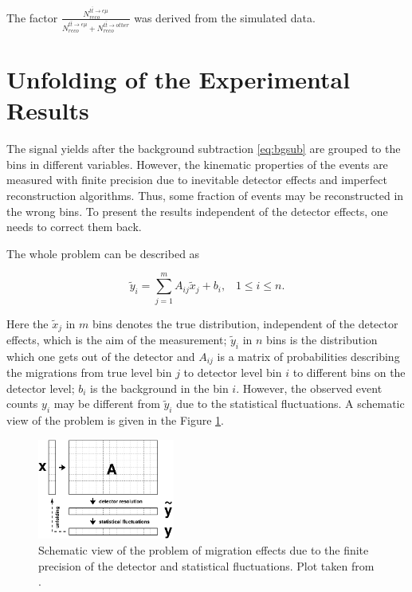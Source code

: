 The factor $\frac{N^{t\bar{t} \rightarrow e\mu}_{reco}}{N^{t\bar{t} \rightarrow e\mu}_{reco} + N^{t\bar{t} \rightarrow other}_{reco}}$ was derived
from the simulated data.

\section{Unfolding of the Experimental Results}\label{sec:unfold}

The signal yields after the background  subtraction \ref{eq:bgsub} are grouped to the bins in different variables. However, the kinematic properties
of the events are measured with finite precision due to inevitable detector effects and imperfect reconstruction algorithms.
Thus, some fraction of events may be reconstructed in the wrong bins. To present the results independent of the detector effects,
one needs to correct them back.

The whole problem can be described as

\begin{equation}\label{eq:UnfoldProb}
 \tilde{y}_i = \sum_{j = 1}^{m} A_{ij}\tilde{x}_{j} + b_{i}, \;\;\; 1 \leq i \leq n.
\end{equation}

Here the $\tilde{x}_j$ in $m$ bins denotes the true distribution, independent of the detector effects, which is the aim of the measurement;
$\tilde{y}_i$ in $n$ bins is the distribution which one gets out of the detector and $A_{ij}$ is a matrix of probabilities describing 
the migrations from true level bin $j$ to detector level bin $i$ to different bins on the detector level; $b_{i}$ is the background in the bin $i$. 
However, the observed event counts $y_{i}$ may be different from $\tilde{y}_{i}$ due to the statistical fluctuations.
A schematic view of the problem is given in the Figure \ref{fig:scUnf}.

\begin{figure}[t]
  \centering
  \includegraphics[width=0.4\textwidth]{06_DiffXsec/plots/d12-129f1.png}
  \caption{Schematic view of the problem of migration effects due to the finite precision of the detector and statistical 
  fluctuations. Plot taken from \cite{Schmitt:2012kp}.}
  \label{fig:scUnf}
\end{figure}

